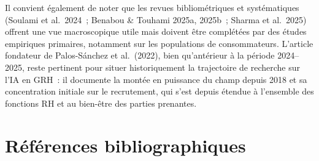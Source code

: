 \documentclass[12pt,a4paper]{article}
\begin{document}
Il convient également de noter que les revues bibliométriques et systématiques (Soulami
et al.~2024~; Benabou \& Touhami 2025a, 2025b~; Sharma et al.~2025) offrent une vue
macroscopique utile mais doivent être complétées par des études empiriques primaires,
notamment sur les populations de consommateurs. L'article fondateur de Palos-Sánchez
et al.~(2022), bien qu'antérieur à la période 2024--2025, reste pertinent pour situer
historiquement la trajectoire de recherche sur l'IA en GRH~: il documente la montée en
puissance du champ depuis 2018 et sa concentration initiale sur le recrutement, qui s'est
depuis étendue à l'ensemble des fonctions RH et au bien-être des parties prenantes.

\newpage
\section*{Références bibliographiques}
\end{document}
